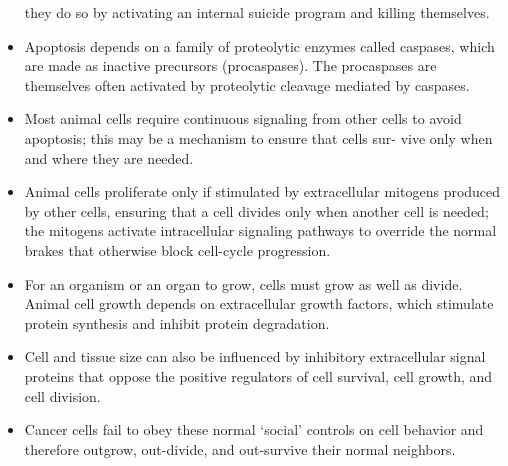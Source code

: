 \begin{itemize}
they do so by activating an internal suicide program and killing
themselves.
\item Apoptosis depends on a family of proteolytic enzymes called caspases,
which are made as inactive precursors (procaspases). The
procaspases are themselves often activated by proteolytic cleavage
mediated by caspases.
\item Most animal cells require continuous signaling from other cells to
avoid apoptosis; this may be a mechanism to ensure that cells sur-
vive only when and where they are needed.
\item Animal cells proliferate only if stimulated by extracellular mitogens
produced by other cells, ensuring that a cell divides only when
another cell is needed; the mitogens activate intracellular signaling
pathways to override the normal brakes that otherwise block cell-cycle
progression.
\item For an organism or an organ to grow, cells must grow as well as
divide. Animal cell growth depends on extracellular growth factors,
which stimulate protein synthesis and inhibit protein degradation.
\item Cell and tissue size can also be influenced by inhibitory extracellular
signal proteins that oppose the positive regulators of cell survival,
cell growth, and cell division.
\item Cancer cells fail to obey these normal ‘social’ controls on cell behavior
and therefore outgrow, out-divide, and out-survive their normal
neighbors.
\end{itemize}
